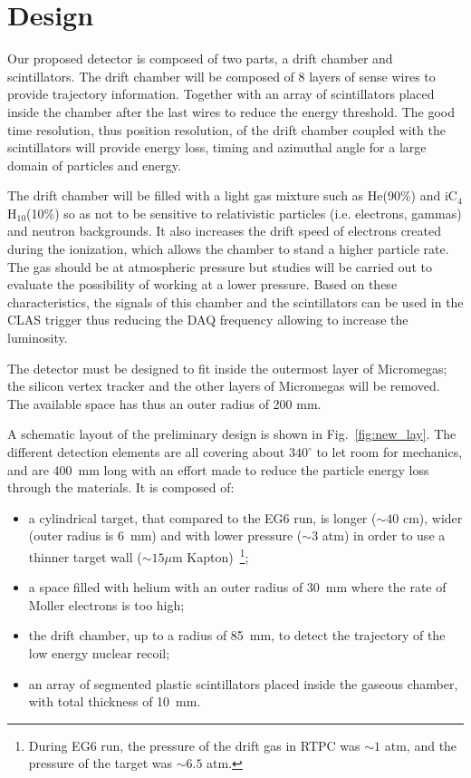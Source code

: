 \section{Design}

Our proposed detector is composed of two parts, a drift chamber and scintillators. The drift chamber will be composed of 8 layers of sense wires to provide trajectory information. Together with an array of scintillators placed inside the chamber after the last wires to reduce the energy threshold. The good time resolution, thus position resolution, of the drift chamber coupled with the scintillators will provide energy loss, timing and azimuthal angle for a large domain of particles and energy.

The drift chamber will be filled with a light gas mixture such as He(90\%) and iC$_4$H$_10$(10\%) so as not to be sensitive to relativistic particles (i.e. electrons, gammas) and neutron backgrounds. It also increases the drift speed of electrons created during the ionization, which allows the chamber to stand a higher particle rate. The gas should be at atmospheric pressure but studies will be carried out to evaluate the possibility of working at a lower pressure. Based on these characteristics, the signals of this chamber and the scintillators can be used in the CLAS trigger thus reducing the DAQ frequency allowing to increase the luminosity.

The detector must be designed to fit inside the outermost layer of Micromegas; the silicon vertex tracker and the other layers of Micromegas will be removed. The available space has thus an outer radius of 200 mm.

A schematic layout of the preliminary design is shown in Fig.~\ref{fig:new_lay}. The different detection elements are all covering about $340^{\circ}$ to let room for mechanics, and are 400~mm long with an effort made to reduce the particle energy loss through the materials. It is composed of:
\begin{itemize}
\item a cylindrical target, that compared to the EG6 run, is longer ($\sim \!40$ cm), wider (outer radius is 6~mm) and with lower pressure ($\sim \!3$ atm) in order to use a thinner target wall ($\sim \!15\mu$m Kapton)~\footnote{During EG6 run, the pressure of the drift gas in RTPC was $\sim \!1$ atm, and the pressure of the target was $\sim \!6.5$ atm.};
\item a space filled with helium with an outer radius of 30~mm where the rate of Moller electrons is too high;
\item the drift chamber, up to a radius of 85~mm, to detect the trajectory of the low energy nuclear recoil;
\item an array of segmented plastic scintillators placed inside the gaseous chamber, with total thickness of 10~mm.
\end{itemize}


